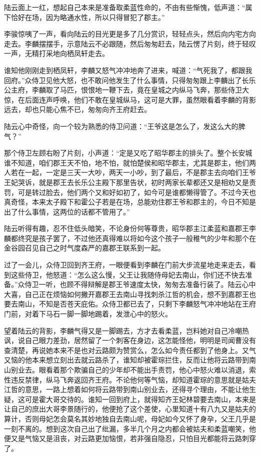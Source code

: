 陆云面上一红，想起自己本来是准备取柔蓝性命的，不由有些惭愧，低声道：“属下恰好在场，因为略通水性，所以只得冒犯了郡主。”

李骏惊咦了一声，看向陆云的目光更是多了几分赏识，轻轻点头，然后向内宅方向走去。李麟摆摆手，示意陆云不必跟随，然后匆匆赶去，陆云愣了片刻，终于轻叹一声，无精打采地向栖凤轩走去。

谁知他刚刚走到栖凤轩，李麟又怒气冲冲地奔了进来，喊道：“气死我了，都跟我回府。”众侍卫见他大怒，也不敢问他发生了什么事情，只得匆匆跟上李麟出了长乐公主府，李麟取了马匹，恨恨地一鞭下去，竟在皇城之内纵马飞奔，那些侍卫大惊，在后面连声呼唤，他们不敢在皇城纵马，这可是大罪，虽然眼看着李麟的背影远去，却也只能心焦不已，匆匆向齐王府赶去。

陆云心中奇怪，向一个较为熟悉的侍卫问道：“王爷这是怎么了，发这么大的脾气？”

那个侍卫左顾右盼了片刻，小声道：“定是又吃了昭华郡主的排头了。整个长安城谁不知道，咱们郡王天不怕，地不怕，就怕楚侯和昭华郡主，尤其是郡主，他们两人若在一起，一定是三天一大吵，两天一小吵，到了最后，不是郡主去向咱们王爷王妃哭诉，就是郡王去长乐公主殿下那里告状，初时两家长辈都还又是相劝又是责罚，可是转过脸去，他们两个又和好如初了，如今可是谁都懒得管了。不过今天也真奇怪，本来太子殿下和霍公子若是在场，总能劝住郡王爷和郡主的，今日不知是出了什么事情，这两位的话都不管用了。”

陆云听得有趣，忍不住低头暗笑，不论身份何等尊贵，昭华郡主江柔蓝和嘉郡王李麟都终究是孩子罢了，不过他还真得难以将如今这个孩子一般稚气的少年和那个在金谷园召见自己之时气度森严的嘉郡王联系到一起。

过了一会儿，众侍卫回到齐王府，一眼便看到李麟在门前大步流星地走来走去，看到这些侍卫，他怒道：“怎么这么慢，父王让我随侍母妃去南山，你们还不快去准备。”众侍卫一听，也顾不得辩解是郡王爷速度太快，匆匆去准备行装了。陆云心中大喜，自己正在烦恼如何撇开嘉郡王去南山寻找刺杀江哲的机会，想不到嘉郡王也要去南山，不知是否苍天庇佑。众侍卫都已去了，只剩下李麟怒气冲冲地站在王府门前，对着下马石一脚一脚地踢着，发泄心中的怒火。

望着陆云的背影，李麟气得又是一脚踢去，方才去看柔蓝，岂料她对自己冷嘲热讽，说自己眼力差劲，居然留了一个刺客在身边，这怎能怪他，明明是司闻曹没有查清楚，再说她本来不是也对云路颇为赞赏么，怎么如今责任都到了他身上。又气又恼的他本来想立刻出去就云路杀了，谁知却被霍琮拦住，反而让他将云路带到南山别业去。眼看着那个欺骗自己的少年却不能出手责罚，他心中怒火难以消退，索性违反禁律，纵马飞奔返回齐王府。不论他何等气恼，却知道霍琮的意思就是姑夫江哲的意思，一路上想着如何将云路带到南山别业去，还得寻个理由，不能让他生疑，这可是霍大哥交待的。谁知一回到府上，就得知齐王妃林碧要去南山，本来是让自己的庶出大哥李景随行的，他便抢了这个差使，心里知道十有八九又是姑夫的算计，否则母妃怎会莫名其妙地独自去南山呢，母妃如今又怀了身孕，父王几乎是一刻不离的。想到这次自己出了纰漏，多半几个月之内都会被姑夫和柔蓝嘲笑，他便又是气恼又是沮丧，对云路更加恼恨，若非强自隐忍，只怕目光都能将云路刺穿了。

